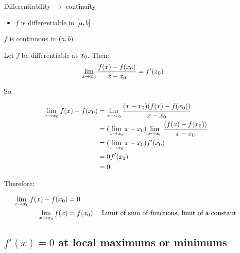 \begin{property}{Differentiability $→$ continuity}
\begin{precondition}
\begin{itemize}
    \item $f$ is differentiable in $\left[a,b \right]$
\end{itemize}
\end{precondition}
\begin{claim}
    $f$ is continuous in $(a,b)$
\end{claim}

\begin{Proof}
Let $f$ be differentiable  at $x_0$. Then:
\begin{align*}
\lim\limits_{x \rightarrow x_0}  \frac{f(x)-f(x_0)}{x-x_0} &= f'(x_0)
\end{align*}

So:

\begin{align*}
 \lim\limits_{x \rightarrow x_0} f(x)-f(x_0) &=\lim\limits_{x \rightarrow x_0}  \frac{ (x-x_0) (f(x)-f(x_0))}{x-x_0}
\\ &= (\lim\limits_{x \rightarrow x_0} x-x_0) \lim\limits_{x \rightarrow x_0}  \frac{ (f(x)-f(x_0))}{x-x_0}
\\ &= (\lim\limits_{x \rightarrow x_0} x-x_0)   f'(x_0)
\\ &= 0  f'(x_0)
\\ &= 0
\end{align*}

Therefore:

\end{Proof}
\begin{align*}
 \mylim{x}{\xz}{f(x)-f(\xz)} &=0
 \\ \mylim{x}{\xz}{f(x)} &=f(\xz) \mathcomment{Limit of sum of functions, limit of a constant}
\end{align*}
\end{property}

\subsection{$f'(x)=0$ at local maximums or minimums}

